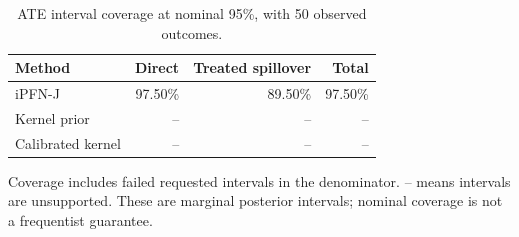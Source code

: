 \begin{table}[tb]
\centering
\caption{ATE interval coverage at nominal 95\%, with 50 observed outcomes.}
\begin{tabular}{lrrr}
\toprule
Method & Direct & Treated spillover & Total \\
\midrule
iPFN-J & 97.50\% & 89.50\% & 97.50\% \\
Kernel prior & -- & -- & -- \\
Calibrated kernel & -- & -- & -- \\
\bottomrule
\end{tabular}
\par\smallskip
\begin{minipage}{\linewidth}\scriptsize
Coverage includes failed requested intervals in the denominator. -- means intervals are unsupported.
These are marginal posterior intervals; nominal coverage is not a frequentist guarantee.
\end{minipage}
\end{table}

